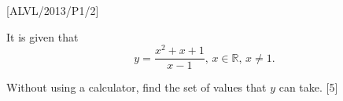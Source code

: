 \item {[}ALVL/2013/P1/2{]}

It is given that 
\[
y=\frac{x^{2}+x+1}{x-1},\,x\in\mathbb{R},\,x\neq1.
\]
 

Without using a calculator, find the set of values that $y$ can take.
\hfill{} {[}5{]}
